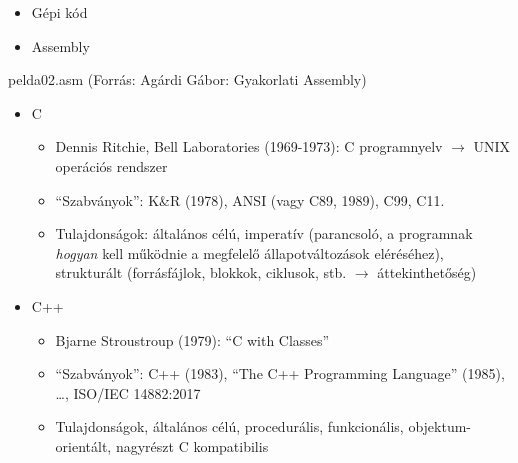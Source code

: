 \documentclass[usenames,dvipsnames,aspectratio=169]{beamer}
\begin{document}
\begin{frame}[fragile]
  \begin{itemize}
    \item Gépi kód
    \item Assembly
  \end{itemize}
  \begin{exampleblock}{pelda02.asm (Forrás: Agárdi Gábor: Gyakorlati Assembly)}
    \tiny
    
  \end{exampleblock}
\end{frame}

\begin{frame}
  \begin{itemize}
    \item C
    \begin{itemize}
      \item Dennis Ritchie, Bell Laboratories (1969-1973): C programnyelv $\rightarrow$ UNIX operációs rendszer
      \item ``Szabványok'': K\&R (1978), ANSI (vagy C89, 1989), C99, C11.
      \item Tulajdonságok: általános célú, imperatív (parancsoló, a programnak \emph{hogyan} kell működnie a megfelelő 
állapotváltozások eléréséhez), strukturált (forrásfájlok, blokkok, ciklusok, stb. $\rightarrow$ áttekinthetőség)   
    \end{itemize}
    \item C++
    \begin{itemize}
      \item Bjarne Stroustroup (1979): ``C with Classes''
      \item ``Szabványok'': C++ (1983), ``The C++ Programming Language'' (1985), \dots, ISO/IEC 14882:2017
      \item Tulajdonságok, általános célú, procedurális, funkcionális, objektum-orientált, nagyrészt C kompatibilis
    \end{itemize}
  \end{itemize}
\end{frame}
\end{document}
